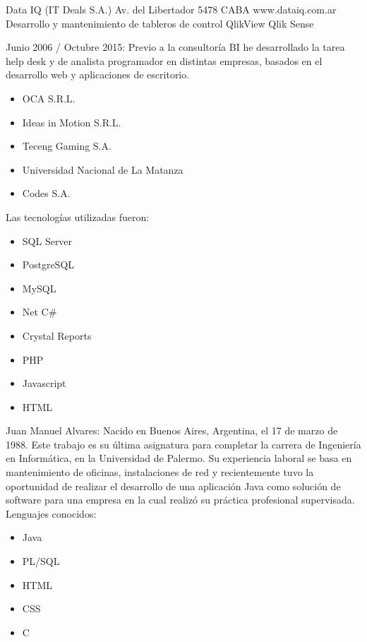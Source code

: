 \documentclass{IEEEtran}
\begin{document}
        Data IQ (IT Deals S.A.)
        Av. del Libertador 5478 CABA
        www.dataiq.com.ar
        Desarrollo y mantenimiento de tableros de control
        QlikView
        Qlik Sense
        
        Junio 2006 / Octubre 2015:
        Previo a la consultoría BI he desarrollado la tarea help desk y de analista programador en distintas empresas, basados en el desarrollo web y aplicaciones de escritorio.
        
        \begin{itemize}
			\item OCA S.R.L.
			\item Ideas in Motion S.R.L.
			\item Teceng Gaming S.A.
			\item Universidad Nacional de La Matanza
            \item Codes S.A.
		\end{itemize}
        
        Las tecnologías utilizadas fueron:
        
        \begin{itemize}
			\item SQL Server
			\item PostgreSQL
			\item MySQL
			\item Net C\# 
            \item Crystal Reports
            \item PHP
            \item Javascript
            \item HTML
		\end{itemize}
		\vspace{10mm}
		\newpage
		Juan Manuel Alvares: Nacido en Buenos Aires, Argentina, el 17 de marzo de 1988.
Este trabajo es su última asignatura para completar la carrera de Ingeniería en Informática, en la Universidad de Palermo.
Su experiencia laboral se basa en mantenimiento de oficinas, instalaciones de red y recientemente tuvo la oportunidad de realizar el desarrollo de una aplicación Java como solución de software para una empresa en la cual realizó su práctica profesional supervisada.
Lenguajes conocidos: 
\begin{itemize}
			\item Java
			\item PL/SQL
			\item HTML
			\item CSS 
            \item C
		\end{itemize}

    

		
\end{document}
